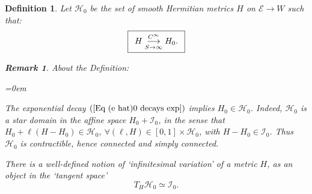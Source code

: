 \documentclass{article}
\newcommand{\tublim}{\overset{C^\infty}{\underset{S\rightarrow\infty}{\longrightarrow}}}
\newtheorem{definition}[theorem]{Definition}
\newtheorem{remark}[theorem]{Remark}
\begin{document}
\begin{definition}      \label{Def space of Hermitian bundle metrics}
Let $\mathcal{H}_{0}$ be the set of smooth Hermitian metrics $H$ on $\mathcal{E}\rightarrow W$ such that:
\begin{displaymath}
\fbox{$
\begin{array}{c}
        H \tublim H_0. \\
\end{array}
$} 
\end{displaymath}

\begin{remark}       \label{Rem All about H0}
About the \emph{Definition}:
\begin{list}{}{\leftmargin=0em}
        \item[(1)] 
        The exponential decay $\left(\ref{Eq (e hat)0 decays exp}\right)$ implies $H_{0}\in \mathcal{H}_{0}$. Indeed, $\mathcal{H}_{0}$ is a \emph{star domain} in the affine space $H_0+\mathcal{I}_0$, in the sense that $H_{0}+\ell\left( H-H_{0} \right)\in \mathcal{H}_0$, $\forall\left(\ell,H\right)\in[0,1]\times \mathcal{H}_0$, with $H-H_{0}\in \mathcal{I}_0$. Thus $\mathcal{H}_{0}$ is contractible, hence \emph{connected} and \emph{simply connected}.

        \item[(2)] 
There is a well-defined notion of `infinitesimal variation' of a metric $H$, as an object in the `tangent space'
        \begin{equation*}
                T_{H}\mathcal{H}_{0}\simeq \mathcal{I}_{0}.
        \end{equation*}


\end{list}
\end{remark}
\end{definition}
\end{document}
